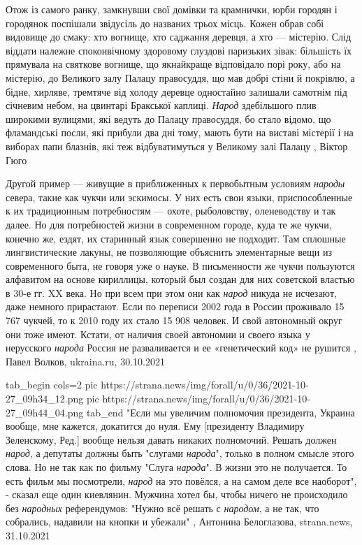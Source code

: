 Отож із самого ранку, замкнувши свої домівки та крамнички, юрби городян і
городянок поспішали звідусіль до названих трьох місць. Кожен обрав собі
видовище до смаку: хто вогнище, хто саджання деревця, а хто — містерію. Слід
віддати належне споконвічному здоровому глуздові паризьких зівак: більшість їх
прямувала на святкове вогнище, що якнайкраще відповідало порі року, або на
містерію, до Великого залу Палацу правосуддя, що мав добрі стіни й покрівлю, а
бідне, хирляве, тремтяче від холоду деревце одностайно залишали самотнім під
січневим небом, на цвинтарі Бракської каплиці.  \emph{Народ} здебільшого плив
широкими вулицями, які ведуть до Палацу правосуддя, бо стало відомо, що
фламандські посли, які прибули два дні тому, мають бути на виставі містерії і
на виборах папи блазнів, які теж відбуватимуться у Великому залі Палацу
, Віктор Гюго

Другой пример — живущие в приближенных к первобытным условиям \emph{народы}
севера, такие как чукчи или эскимосы. У них есть свои языки, приспособленные к
их традиционным потребностям — охоте, рыболовству, оленеводству и так далее. Но
для потребностей жизни в современном городе, куда те же чукчи, конечно же,
ездят, их старинный язык совершенно не подходит. Там сплошные лингвистические
лакуны, не позволяющие объяснить элементарные вещи из современного быта, не
говоря уже о науке.  В письменности же чукчи пользуются алфавитом на основе
кириллицы, который был создан для них советской властью в 30-е гг. XX века. Но
при всем при этом они как \emph{народ} никуда не исчезают, даже немного
прирастают. Если по переписи 2002 года в России проживало 15 767 чукчей, то к
2010 году их стало 15 908 человек.  И свой автономный округ они тоже имеют.
Кстати, от наличия своей автономии и своего языка у нерусского \emph{народа}
Россия не разваливается и ее «генетический код» не рушится
, 
Павел Волков, ukraina.ru, 30.10.2021


\ifcmt
  tab_begin cols=2
     pic https://strana.news/img/forall/u/0/36/2021-10-27_09h34_12.png
     pic https://strana.news/img/forall/u/0/36/2021-10-27_09h44_04.png
  tab_end
\fi
"Если мы увеличим полномочия президента, Украина вообще, мне кажется, докатится
до нуля. Ему [президенту Владимиру Зеленскому, Ред.] вообще нельзя давать
никаких полномочий. Решать должен \emph{народ}, а депутаты должны быть "слугами
\emph{народа}", только в полном смысле этого слова. Но не так как по фильму
"Слуга \emph{народа}". В жизни это не получается. То есть фильм мы посмотрели,
\emph{народ} на это повёлся, а на самом деле все наоборот", - сказал еще один
киевлянин.  Мужчина хотел бы, чтобы ничего не происходило без \emph{народных}
референдумов: "Нужно всё решать с \emph{народом}, а не так, что собрались,
надавили на кнопки и убежали"
, 
Антонина Белоглазова, strana.news, 31.10.2021


